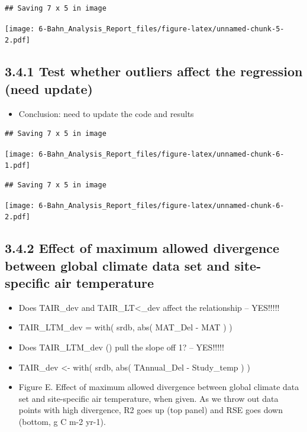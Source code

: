 \documentclass[]{article}
\providecommand{\tightlist}{%
  \setlength{\itemsep}{0pt}\setlength{\parskip}{0pt}}
\begin{document}
\begin{verbatim}
## Saving 7 x 5 in image
\end{verbatim}

\texttt{[image: 6-Bahn\_Analysis\_Report\_files/figure-latex/unnamed-chunk-5-2.pdf]}

\hypertarget{test-whether-outliers-affect-the-regression-need-update}{%
\subsection{3.4.1 Test whether outliers affect the regression (need
update)}\label{test-whether-outliers-affect-the-regression-need-update}}

\begin{itemize}
\tightlist
\item
  Conclusion: need to update the code and results
\end{itemize}

\begin{verbatim}
## Saving 7 x 5 in image
\end{verbatim}

\texttt{[image: 6-Bahn\_Analysis\_Report\_files/figure-latex/unnamed-chunk-6-1.pdf]}

\begin{verbatim}
## Saving 7 x 5 in image
\end{verbatim}

\texttt{[image: 6-Bahn\_Analysis\_Report\_files/figure-latex/unnamed-chunk-6-2.pdf]}

\hypertarget{effect-of-maximum-allowed-divergence-between-global-climate-data-set-and-site-specific-air-temperature}{%
\subsection{3.4.2 Effect of maximum allowed divergence between global
climate data set and site-specific air
temperature}\label{effect-of-maximum-allowed-divergence-between-global-climate-data-set-and-site-specific-air-temperature}}

\begin{itemize}
\tightlist
\item
  Does TAIR\_dev and TAIR\_LT\textless\_dev affect the relationship --
  YES!!!!!
\item
  TAIR\_LTM\_dev = with( srdb, abs( MAT\_Del - MAT ) )
\item
  Does TAIR\_LTM\_dev () pull the slope off 1? -- YES!!!!!
\item
  TAIR\_dev \textless- with( srdb, abs( TAnnual\_Del - Study\_temp ) )
\item
  Figure E. Effect of maximum allowed divergence between global climate
  data set and site-specific air temperature, when given. As we throw
  out data points with high divergence, R2 goes up (top panel) and RSE
  goes down (bottom, g C m-2 yr-1).
\end{itemize}
\end{document}
